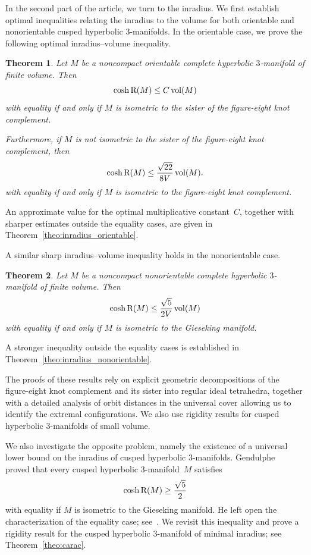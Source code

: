 \documentclass[11pt,reqno]{amsart}
\newtheorem{theorem}{Theorem}[section]
\theoremstyle{definition}
\numberwithin{equation}{section}
\newcommand\RR{{\rm R}}
\DeclareMathOperator{\vol}{{\rm vol}}
\numberwithin{equation}{section}
\begin{document}
In the second part of the article, we turn to the inradius.
We first establish optimal inequalities relating the inradius to the volume for both orientable and nonorientable cusped hyperbolic $3$-manifolds.
In the orientable case, we prove the following optimal inradius--volume inequality.

\begin{theorem}
Let $M$ be a noncompact orientable complete hyperbolic $3$-manifold of finite volume.
Then
\[
\cosh \RR(M) \leq C \vol(M)
\]
with equality if and only if $M$ is isometric to the sister of the figure-eight knot complement.

Furthermore, if $M$ is not isometric to the sister of the figure-eight knot complement, then
\[
\cosh \RR(M) \leq \frac{\sqrt{22}}{8V} \vol(M).
\]
with equality if and only if $M$ is isometric to the figure-eight knot complement.
\end{theorem}

An approximate value for the optimal multiplicative constant~$C$, together with sharper estimates outside the equality cases, are given in Theorem~\ref{theo:inradius_orientable}.

\medskip

A similar sharp inradius--volume inequality holds in the nonorientable case.

\begin{theorem}
Let $M$ be a noncompact nonorientable complete hyperbolic $3$-manifold of finite volume.
Then
\[
\cosh \RR(M) \leq \frac{\sqrt{5}}{2V} \vol(M)
\]
with equality if and only if $M$ is isometric to the Gieseking manifold.
\end{theorem}

A  stronger inequality outside the equality cases is established in Theorem~\ref{theo:inradius_nonorientable}.

\medskip

The proofs of these results rely on explicit geometric decompositions of the figure-eight knot complement and its sister into regular ideal tetrahedra, together with a detailed analysis of orbit distances in the universal cover allowing us to identify the extremal configurations.
We also use rigidity results for cusped hyperbolic $3$-manifolds of small volume.

\medskip

We also investigate the opposite problem, namely the existence of a universal lower bound on the inradius of cusped hyperbolic $3$-manifolds.
Gendulphe~\cite{gen} proved that every cusped hyperbolic $3$-manifold~$M$ satisfies
\[
\cosh \RR(M) \geq \frac{\sqrt{5}}{2}
\]
with equality if $M$ is isometric to the Gieseking manifold.
He left open the characterization of the equality case; see~\cite[Remarque~3.2]{gen}.
We revisit this inequality and prove a rigidity result for the cusped hyperbolic $3$-manifold of minimal inradius; see Theorem~\ref{theo:carac}.
\end{document}
